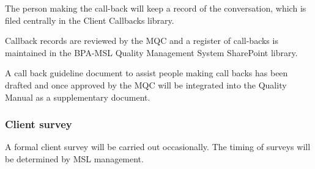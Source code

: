 The person making the call-back will keep a record of the conversation, which is filed centrally in the Client Callbacks library. 

Callback records are reviewed by the MQC and a register of call-backs is maintained in the BPA-MSL Quality Management System SharePoint library.

A call back guideline document to assist people making call backs has been drafted and once approved by the MQC will be integrated into the Quality Manual as a supplementary document.

\subsubsection{Client survey}
A formal client survey will be carried out occasionally. The timing of surveys will be determined by MSL management.